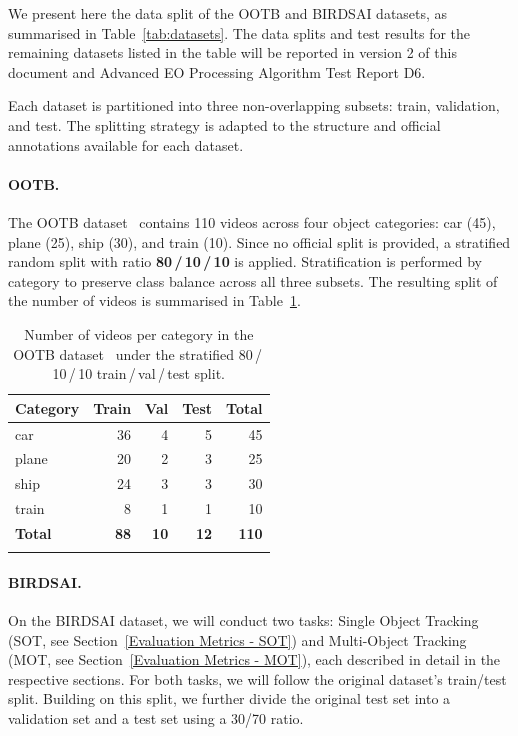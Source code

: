 \documentclass[11pt]{article}
\begin{document}
We present here the data split of the OOTB and BIRDSAI datasets, as summarised 
in Table~\ref{tab:datasets}. The data splits and test results for the 
remaining datasets listed in the table will be reported in version 2 of 
this document and Advanced EO Processing Algorithm Test Report D6.

Each dataset is partitioned into three non-overlapping subsets: train, validation, and test. 
The splitting strategy is adapted to the structure and official annotations available for each dataset.

\paragraph{OOTB.} 

The OOTB dataset~\cite{chen2022single} contains 110 videos across four object categories: car (45), plane (25), ship (30), and train (10). 
Since no official split is provided, a stratified random split with ratio \textbf{80\,/\,10\,/\,10} is applied. 
Stratification is performed by category to preserve class balance across all three subsets. The resulting split of the number of videos is summarised in Table~\ref{tab:ootb-split}.

\renewcommand{\arraystretch}{1.3}
\begin{longtable}[c]{@{}lrrrr@{}}
\rowcolor{gray!20}
\textbf{Category} & \textbf{Train} & \textbf{Val} & \textbf{Test} & \textbf{Total} \\
\midrule
\endhead
car   & 36 & 4 &  5 &  45 \\
plane & 20 & 2 &  3 &  25 \\
ship  & 24 & 3 &  3 &  30 \\
train &  8 & 1 &  1 &  10 \\
\midrule
\textbf{Total} & \textbf{88} & \textbf{10} & \textbf{12} & \textbf{110} \\
\caption{Number of videos per category in the OOTB dataset~\cite{chen2022single} under the stratified 80\,/\,10\,/\,10 train\,/\,val\,/\,test split.\label{tab:ootb-split}}\\
\end{longtable}
\renewcommand{\arraystretch}{1}

\paragraph{BIRDSAI.} 

On the BIRDSAI dataset, we will conduct two tasks: Single Object Tracking (SOT, see Section~\ref{Evaluation Metrics - SOT}) and Multi-Object Tracking (MOT, see Section~\ref{Evaluation Metrics - MOT}), each described in detail in the respective sections.
For both tasks, we will follow the original dataset's train/test split. Building on this split, we further divide the original test set into a validation set and a test set using a 30/70 ratio.
\end{document}
